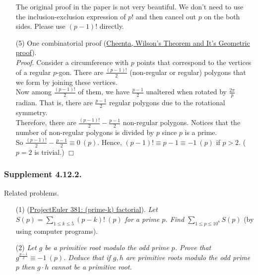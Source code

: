 \documentclass{article}
\begin{document}
\begin{enumerate}
The original proof in the paper is not very beautiful.
We don't need to use the inclusion-exclusion expression of $p!$
and then cancel out $p$ on the both sides. Please use $(p - 1)!$ directly.
\item[(5)]
One combinatorial proof
(\href{https://www.youtube.com/watch?v=4qbh7mC6YCY}
{Cheenta, Wilson's Theorem and It's Geometric proof}). \\
\emph{Proof.}
Consider a circumference with $p$ points that correspond to the vertices of a regular $p$-gon.
There are $\frac{(p - 1)!}{2}$ (non-regular or regular) polygons
that we form by joining these vertices. \\

Now among $\frac{(p - 1)!}{2}$ of them, we have $\frac{p - 1}{2}$ unaltered
when rotated by $\frac{2 \pi}{p}$ radian.
That is, there are $\frac{p - 1}{2}$ regular polygons due to the rotational symmetry. \\

Therefore, there are $\frac{(p - 1)!}{2} - \frac{p - 1}{2}$ non-regular polygons.
Notices that the number of non-regular polygons is divided by $p$ since $p$ is a prime. \\

So $\frac{(p - 1)!}{2} - \frac{p - 1}{2} \equiv 0 \: (p)$.
Hence, $(p - 1)! \equiv p - 1 \equiv -1 \: (p)$ if $p > 2$. ($p = 2$ is trivial.)
$\Box$ \\

\end{enumerate}



\subsubsection*{Supplement 4.12.2.}
Related problems.
\begin{enumerate}
\item[(1)]
(\href{https://projecteuler.net/problem=381}
{ProjectEuler 381: (prime-k) factorial}).
\emph{Let $S(p) = \sum_{1 \leq k \leq 5}(p-k)! \: (p)$ for a prime $p$.
Find $\sum_{1 \leq p \leq {10}^8} S(p)$} (by using computer programs).
\item[(2)]
\emph{Let $g$ be a primitive root modulo the odd prime $p$.
Prove that $g^{\frac{p - 1}{2}} \equiv -1 \: (p)$.
Deduce that if $g, h$ are primitive roots modulo the odd prime $p$
then $g \cdot h$ cannot be a primitive root.} \\\\
\end{enumerate}
\end{document}
